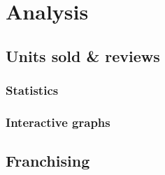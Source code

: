 \chapter{Analysis}
\section{Units sold \& reviews}
\subsection{Statistics}

\subsection{Interactive graphs}

\section{Franchising}
